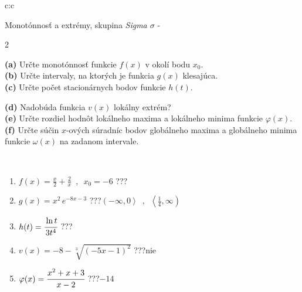 \documentclass[10pt]{report}
\begin{document}
\newpage
\thispagestyle{empty}
\begin{tabular}{c:c}
\begin{minipage}[c][104.5mm][t]{0.5\linewidth}
\begin{center}
\vspace{7mm}
{\huge Monotónnosť a extrémy, skupina \textit{Sigma $\sigma$} -}\\[5mm]
\begin{minipage}{0.95\linewidth}
\begin{center}
{\small \begin{multicols}{2} \raggedright
\textbf{(a)} Určte monotónnosť funkcie \(f(x)\) v okolí bodu \(x_0\). \\[1mm]
\textbf{(b)} Určte intervaly, na ktorých je funkcia \(g(x)\) klesajúca. \\[1mm]
\textbf{(c)} Určte počet stacionárnych bodov funkcie \(h(t)\). \par \columnbreak
\textbf{(d)} Nadobúda funkcia \(v(x)\) lokálny extrém? \\[1mm]
\textbf{(e)} Určte rozdiel hodnôt lokálneho maxima a lokálneho minima funkcie \(\varphi(x)\). \\[1mm]
\textbf{(f)} Určte súčin \(x\)-ových súradníc bodov globálneho maxima a globálneho minima funkcie \(\omega(x)\) na zadanom intervale. \\[1mm]
\end{multicols}
}
\end{center}
\end{minipage}
\\[4mm]
\begin{minipage}{0.79\linewidth}
\begin{center}
\begin{varwidth}{\linewidth}
\begin{enumerate}
\normalsize
\item $f(x)=\frac{x}{2}+\frac{2}{x} \enspace , \enspace x_0=-6$\quad \dotfill\; ???\;\dotfill \quad {}
\item $g(x)=x^2\, e^{-8x-3}$\quad \dotfill\; ???\;\dotfill \quad $\left(-\infty , 0\right\rangle\enspace , \enspace \left\langle\frac{1}{4} , \infty\right)$
\item $h(t)=\cfrac{\ln t}{3t^4}$\quad \dotfill\; ???\;\dotfill {}
\item $v(x)=-8-\sqrt[3]{(-5x-1)^2}$\quad \dotfill\; ???\;\dotfill \quad $\text{nie}$
\item $\varphi(x)=\cfrac{x^2+x+3}{x-2}$\quad \dotfill\; ???\;\dotfill \quad $-14$

\end{enumerate}
\end{varwidth}
\end{center}
\end{minipage}
\end{center}
\end{minipage}
\end{tabular}
\end{document}
